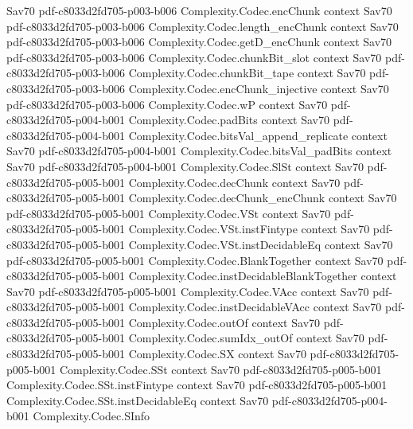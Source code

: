 \begin{theorem}
  {Sav70}
  {pdf-c8033d2fd705-p003-b006}
\proofstep
  {Complexity.Codec.encChunk}
  {context}
  {Sav70}
  {pdf-c8033d2fd705-p003-b006}
\proofstep
  {Complexity.Codec.length_encChunk}
  {context}
  {Sav70}
  {pdf-c8033d2fd705-p003-b006}
\proofstep
  {Complexity.Codec.getD_encChunk}
  {context}
  {Sav70}
  {pdf-c8033d2fd705-p003-b006}
\proofstep
  {Complexity.Codec.chunkBit_slot}
  {context}
  {Sav70}
  {pdf-c8033d2fd705-p003-b006}
\proofstep
  {Complexity.Codec.chunkBit_tape}
  {context}
  {Sav70}
  {pdf-c8033d2fd705-p003-b006}
\proofstep
  {Complexity.Codec.encChunk_injective}
  {context}
  {Sav70}
  {pdf-c8033d2fd705-p003-b006}
\proofstep
  {Complexity.Codec.wP}
  {context}
  {Sav70}
  {pdf-c8033d2fd705-p004-b001}
\proofstep
  {Complexity.Codec.padBits}
  {context}
  {Sav70}
  {pdf-c8033d2fd705-p004-b001}
\proofstep
  {Complexity.Codec.bitsVal_append_replicate}
  {context}
  {Sav70}
  {pdf-c8033d2fd705-p004-b001}
\proofstep
  {Complexity.Codec.bitsVal_padBits}
  {context}
  {Sav70}
  {pdf-c8033d2fd705-p004-b001}
\proofstep
  {Complexity.Codec.SlSt}
  {context}
  {Sav70}
  {pdf-c8033d2fd705-p005-b001}
\proofstep
  {Complexity.Codec.decChunk}
  {context}
  {Sav70}
  {pdf-c8033d2fd705-p005-b001}
\proofstep
  {Complexity.Codec.decChunk_encChunk}
  {context}
  {Sav70}
  {pdf-c8033d2fd705-p005-b001}
\proofstep
  {Complexity.Codec.VSt}
  {context}
  {Sav70}
  {pdf-c8033d2fd705-p005-b001}
\proofstep
  {Complexity.Codec.VSt.instFintype}
  {context}
  {Sav70}
  {pdf-c8033d2fd705-p005-b001}
\proofstep
  {Complexity.Codec.VSt.instDecidableEq}
  {context}
  {Sav70}
  {pdf-c8033d2fd705-p005-b001}
\proofstep
  {Complexity.Codec.BlankTogether}
  {context}
  {Sav70}
  {pdf-c8033d2fd705-p005-b001}
\proofstep
  {Complexity.Codec.instDecidableBlankTogether}
  {context}
  {Sav70}
  {pdf-c8033d2fd705-p005-b001}
\proofstep
  {Complexity.Codec.VAcc}
  {context}
  {Sav70}
  {pdf-c8033d2fd705-p005-b001}
\proofstep
  {Complexity.Codec.instDecidableVAcc}
  {context}
  {Sav70}
  {pdf-c8033d2fd705-p005-b001}
\proofstep
  {Complexity.Codec.outOf}
  {context}
  {Sav70}
  {pdf-c8033d2fd705-p005-b001}
\proofstep
  {Complexity.Codec.sumIdx_outOf}
  {context}
  {Sav70}
  {pdf-c8033d2fd705-p005-b001}
\proofstep
  {Complexity.Codec.SX}
  {context}
  {Sav70}
  {pdf-c8033d2fd705-p005-b001}
\proofstep
  {Complexity.Codec.SSt}
  {context}
  {Sav70}
  {pdf-c8033d2fd705-p005-b001}
\proofstep
  {Complexity.Codec.SSt.instFintype}
  {context}
  {Sav70}
  {pdf-c8033d2fd705-p005-b001}
\proofstep
  {Complexity.Codec.SSt.instDecidableEq}
  {context}
  {Sav70}
  {pdf-c8033d2fd705-p004-b001}
\proofstep
  {Complexity.Codec.SInfo}

\end{theorem}
